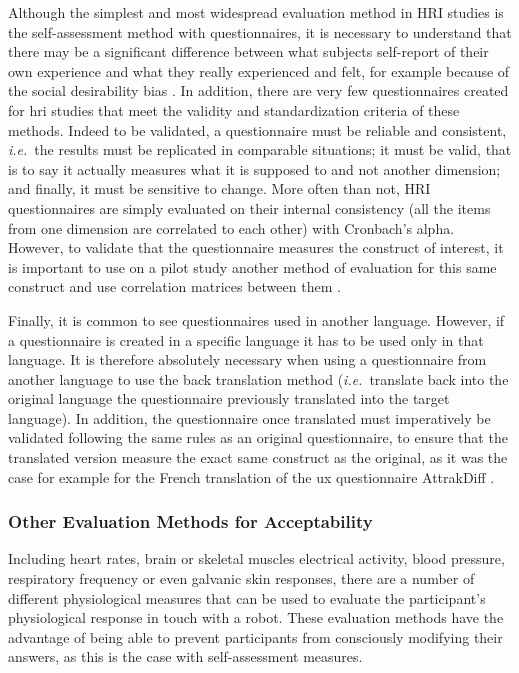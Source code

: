 \documentclass[a4paper,11pt,twoside]{StyleThese}
\begin{document}
Although the simplest and most widespread evaluation method in HRI studies is the self-assessment method with questionnaires, it is necessary to understand that there may be a significant difference between what subjects self-report of their own experience and what they really experienced and felt, for example because of the social desirability bias \cite{fisher1993social}. In addition, there are very few questionnaires created for \acrshort{hri} studies that meet the validity and standardization criteria of these methods. Indeed to be validated, a questionnaire must be reliable and consistent, \textit{i.e.}~the results must be replicated in comparable situations; it must be valid, that is to say it actually measures what it is supposed to and not another dimension; and finally, it must be sensitive to change. More often than not, HRI questionnaires are simply evaluated on their internal consistency (all the items from one dimension are correlated to each other) with Cronbach's alpha. However, to validate that the questionnaire measures the construct of interest, it is important to use on a pilot study another method of evaluation for this same construct and use correlation matrices between them \cite{tsang2017guidelines}. 

Finally, it is common to see questionnaires used in another language. However, if a questionnaire is created in a specific language it has to be used only in that language. It is therefore absolutely necessary when using a questionnaire from another language to use the back translation method (\textit{i.e.}~translate back into the original language the questionnaire previously translated into the target language). In addition, the questionnaire once translated must imperatively be validated following the same rules as an original questionnaire, to ensure that the translated version measure the exact same construct as the original, as it was the case for example for the French translation of the \acrshort{ux} questionnaire AttrakDiff \cite{lallemand_creation_2015}.

\subsubsection{Other Evaluation Methods for Acceptability}

Including heart rates, brain or skeletal muscles electrical activity, blood pressure, respiratory frequency or even galvanic skin responses, there are a number of different physiological measures that can be used to evaluate the participant's physiological response in touch with a robot. These evaluation methods have the advantage of being able to prevent participants from consciously modifying their answers, as this is the case with self-assessment measures.
\end{document}
